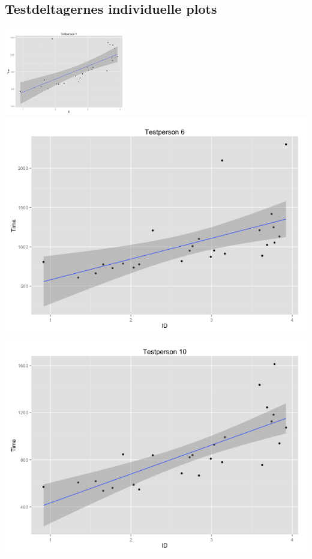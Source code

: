 \begin{appendices}
\chapter{Testdeltagernes individuelle plots}
\begin{minipage}{\textwidth}
\centering
\includegraphics[height=.2\textheight,width=0.4\textwidth]{images/plots/testperson1}
\label{fig:testdeltager1}
\includegraphics[width=.25\textheight,width=0.4\textwidth]{images/plots/testperson6}
\label{fig:testdeltager6}
\includegraphics[width=.25\textheight,width=0.4\textwidth]{images/plots/testperson10}
\label{fig:testdeltager10}
\end{minipage}



\end{appendices}